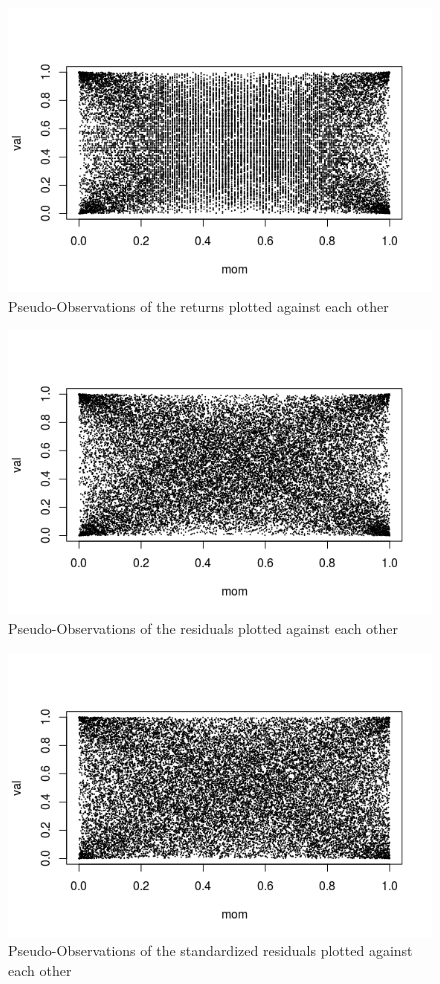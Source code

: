 \documentclass[11pt,letterpaper]{memoir}
\begin{document}
\begin{figure}
\includegraphics[scale=1]{obs}
\caption{Pseudo-Observations of the returns plotted against each other}
\end{figure}
\begin{figure}
\includegraphics[scale=1]{res}
\caption{Pseudo-Observations of the residuals plotted against each other}
\end{figure}
\begin{figure}
\includegraphics[scale=1]{stres}
\caption{Pseudo-Observations of the standardized residuals plotted against each other}
\end{figure}
\end{document}
